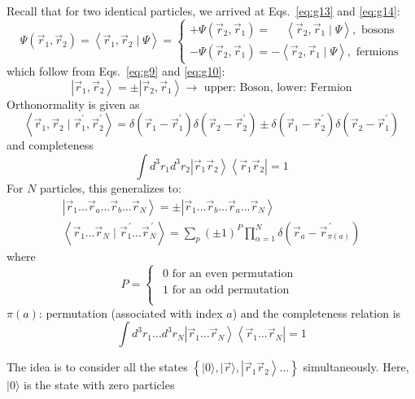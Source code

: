 \documentclass[12pt]{article}
\newcommand{\be}{\begin{equation}}
\newcommand{\ee}{\end{equation}}
\begin{document}
Recall that for two identical particles, we arrived
at Eqs.~\eqref{eq:g13} and \eqref{eq:g14}:
\be
\Psi\left(\vec{r}_{1}, \vec{r}_{2}\right)=\left\langle\vec{r}_{1}, \vec{r}_{2} \mid \Psi\right\rangle
=
\begin{cases}
+\Psi\left(\vec{r}_{2}, \vec{r}_{1}\right)=\phantom{-}\left\langle\vec{r}_{2}, \vec{r}_{1} \mid \Psi\right\rangle,\text{ bosons}\\
-\Psi\left(\vec{r}_{2}, \vec{r}_{1}\right)=-\left\langle\vec{r}_{2}, \vec{r}_{1} \mid \Psi\right\rangle,\text{ fermions}
\end{cases}
\ee
which follow from Eqs.~\eqref{eq:g9} and \eqref{eq:g10}:
\be
\left|\vec{r}_{1}, \vec{r}_{2}\right\rangle=\pm\left|\vec{r}_{2}, \vec{r}_{1}\right\rangle\to\text{ upper: Boson, lower: Fermion}
\ee
Orthonormality is given as
\be
\left\langle\vec{r}_{1}, \vec{r}_{2} \mid \vec{r}_{1}^{\prime}, \vec{r}_{2}^{\prime}\right\rangle=\delta\left(\vec{r}_{1}-\vec{r}_{1}^{\prime}\right) \delta\left(\vec{r}_{2}-\vec{r}_{2}^{\prime}\right) \pm \delta\left(\vec{r}_{1}-\vec{r}_{2}^{\prime}\right) \delta\left(\vec{r}_{2}-\vec{r}_{1}^{\prime}\right)
\ee
and completeness
\be
\int d^{3} r_{1} d^{3} r_{2}\left|\vec{r}_{1} \vec{r}_{2}\right\rangle\left\langle\vec{r}_{1} \vec{r}_{2}\right|=1
\ee
For $N$ particles, this generalizes to:
\begin{gather}
\left|\vec{r}_{1} \ldots \vec{r}_{a} \ldots \vec{r}_{b} \ldots \vec{r}_{N}\right\rangle=\pm\left|\vec{r}_{1} \ldots \vec{r}_{b} \ldots \vec{r}_{a} \ldots \vec{r}_{N}\right\rangle\\
%
\left\langle\vec{r}_{1} \ldots \vec{r}_{N} \mid \vec{r}_{1}^{\,\prime} \ldots \vec{r}_{N}^{\,\prime}\right\rangle=\sum_{p}(\pm 1)^{P} \prod_{\alpha=1}^{N} \delta\left(\vec{r}_{a}-\vec{r}_{\pi(a)}^{\,\prime}\right)
\end{gather}
where
\be
P = \begin{cases}
\begin{gathered}
\text{0 for an even permutation}\\
\text{1 for an odd permutation}\\
\end{gathered}
\end{cases}
\ee
$\pi(a)$: permutation (associated with index $a$)
and the completeness relation is
\be
\int d^{3} r_{1} \ldots d^{3} r_{N}\left|\vec{r}_{1} \ldots \vec{r}_{N}\right\rangle\left\langle\vec{r}_{1} \ldots \vec{r}_{N}\right|=1
\ee


The idea is to consider all the states $\left\{|0\rangle,|\vec{r}\rangle,\left|\vec{r}_{1} \vec{r}_{2}\right\rangle \ldots\right\}$
simultaneously. Here, $|0\rangle$ is the state with zero particles
\end{document}
